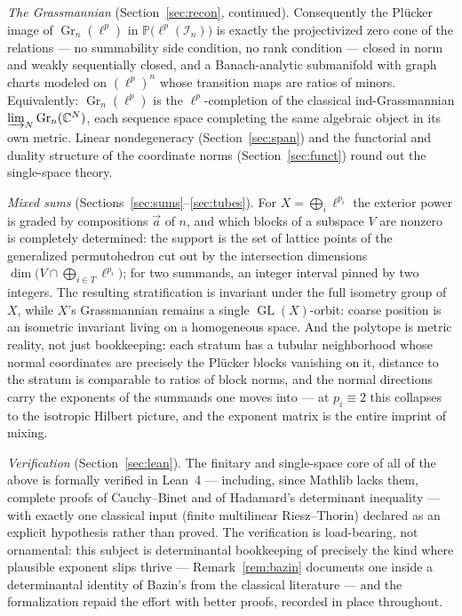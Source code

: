 \documentclass[11pt]{amsart}
\theoremstyle{definition}
\newcommand{\C}{\mathbb{C}}
\newcommand{\Gr}{\operatorname{Gr}}
\newcommand{\GL}{\operatorname{GL}}
\begin{document}
\emph{The Grassmannian} (Section~\ref{sec:recon}, continued). Consequently the Pl\"ucker image of $\Gr_n(\ell^p)$ in $\mathbb P\big(\ell^p(\mathcal I_n)\big)$ is exactly the projectivized zero cone of the relations --- no summability side condition, no rank condition --- closed in norm and weakly sequentially closed, and a Banach-analytic submanifold with graph charts modeled on $(\ell^p)^n$ whose transition maps are ratios of minors. Equivalently: $\Gr_n(\ell^p)$ is the $\ell^p$-completion of the classical ind-Grassmannian $\varinjlim_N\Gr_n(\C^N)$, each sequence space completing the same algebraic object in its own metric. Linear nondegeneracy (Section~\ref{sec:span}) and the functorial and duality structure of the coordinate norms (Section~\ref{sec:funct}) round out the single-space theory.

\emph{Mixed sums} (Sections~\ref{sec:sums}--\ref{sec:tubes}). For $X=\bigoplus_{i}\ell^{p_i}$ the exterior power is graded by compositions $\vec a$ of $n$, and which blocks of a subspace $V$ are nonzero is completely determined: the support is the set of lattice points of the generalized permutohedron cut out by the intersection dimensions $\dim\big(V\cap\bigoplus_{i\in T}\ell^{p_i}\big)$; for two summands, an integer interval pinned by two integers. The resulting stratification is invariant under the full isometry group of $X$, while $X$'s Grassmannian remains a single $\GL(X)$-orbit: coarse position is an isometric invariant living on a homogeneous space. And the polytope is metric reality, not just bookkeeping: each stratum has a tubular neighborhood whose normal coordinates are precisely the Pl\"ucker blocks vanishing on it, distance to the stratum is comparable to ratios of block norms, and the normal directions carry the exponents of the summands one moves into --- at $p_i\equiv2$ this collapses to the isotropic Hilbert picture, and the exponent matrix is the entire imprint of mixing.

\emph{Verification} (Section~\ref{sec:lean}). The finitary and single-space core of all of the above is formally verified in Lean~4 --- including, since Mathlib lacks them, complete proofs of Cauchy--Binet and of Hadamard's determinant inequality --- with exactly one classical input (finite multilinear Riesz--Thorin) declared as an explicit hypothesis rather than proved. The verification is load-bearing, not ornamental: this subject is determinantal bookkeeping of precisely the kind where plausible exponent slips thrive --- Remark~\ref{rem:bazin} documents one inside a determinantal identity of Bazin's from the classical literature --- and the formalization repaid the effort with better proofs, recorded in place throughout.
\end{document}
